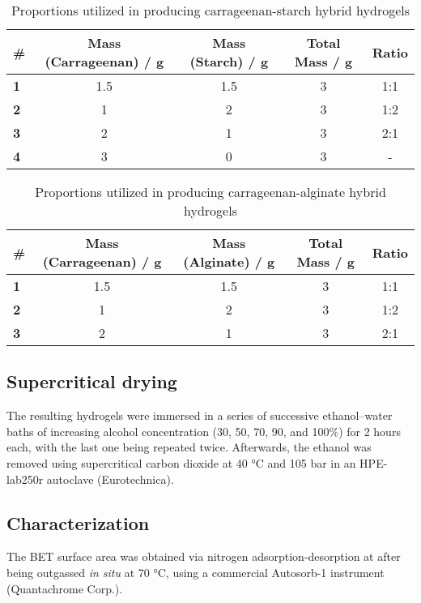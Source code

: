 \documentclass[a4paper,12pt]{article}
\begin{document}
\begin{table}[H]
\centering
\caption{Proportions utilized in producing carrageenan-starch hybrid hydrogels}
\label{tab1}
\begin{tabular}{@{}lcccc@{}}
\toprule
\textbf{\#} & \textbf{Mass (Carrageenan) / g} & \textbf{Mass (Starch) / g} & \textbf{Total Mass / g} & \textbf{Ratio} \\ \midrule
\textbf{1} & 1.5 & 1.5 & 3 & 1:1 \\
\textbf{2} & 1 & 2 & 3 & 1:2 \\
\textbf{3} & 2 & 1 & 3 & 2:1 \\
\textbf{4} & 3 & 0 & 3 & - \\ \bottomrule
\end{tabular}%
\end{table}

\begin{table}[H]
\centering
\caption{Proportions utilized in producing carrageenan-alginate hybrid hydrogels}
\label{tab2}
\begin{tabular}{@{}lcccc@{}}
\toprule
\textbf{\#} & \textbf{Mass (Carrageenan) / g} & \textbf{Mass (Alginate) / g} & \textbf{Total Mass / g} & \textbf{Ratio} \\ \midrule
\textbf{1} & 1.5 & 1.5 & 3 & 1:1 \\
\textbf{2} & 1 & 2 & 3 & 1:2 \\
\textbf{3} & 2 & 1 & 3 & 2:1 \\ \bottomrule
\end{tabular}%
\end{table}



\subsection{Supercritical drying}

The resulting hydrogels were immersed in a series of successive ethanol–water baths of increasing
alcohol concentration (30, 50, 70, 90, and 100\%) for 2 hours each, with the last one being repeated twice. Afterwards, the ethanol was removed using supercritical carbon dioxide at 40 °C and 105 bar in an HPE-lab250r autoclave (Eurotechnica). 

\subsection{Characterization}

The BET surface area was obtained via nitrogen adsorption-desorption at after being outgassed \textit{in situ} at 70 °C, using a commercial Autosorb-1 instrument (Quantachrome Corp.).
\end{document}
